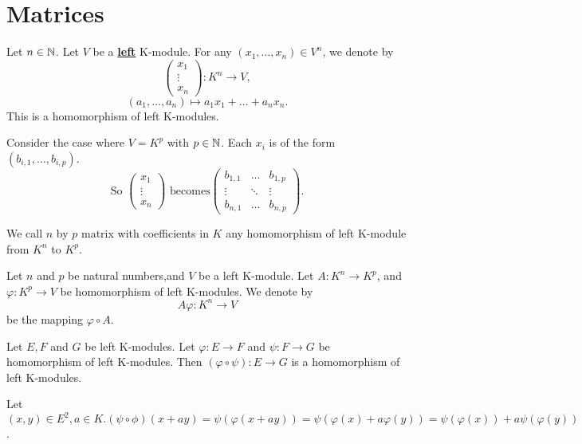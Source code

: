 \section{Matrices}
\begin{definitionenv}
    Let $n\in \mathbb{N}$. Let $V$ be a \underline{\textbf{left}} K-module. For any $(x_1, \dots, x_n)\in V^n$,  we denote by 
    $$\begin{pmatrix}
x_1 \\
 \vdots \\
x_n
\end{pmatrix}
:
K^n\longrightarrow V, $$
$$(a_1, \dots, a_n)\longmapsto a_1x_1+\dots+a_nx_n. $$
This is a homomorphism of left K-modules.
\end{definitionenv}
\begin{exampleenv}
    Consider the case where $V=K^p$ with $p\in \mathbb{N}$. Each $x_i$ is of the form $(b_{i, 1}, \dots, b_{i, p})$.
    $$\text{So } \begin{pmatrix}
x_1 \\
 \vdots \\
x_n
\end{pmatrix}
\text{ becomes}
\begin{pmatrix}
  b_{1, 1}& \dots  &b_{1, p} \\
  \vdots & \ddots  & \vdots \\
  b_{n, 1}& \dots &b_{n, p}
\end{pmatrix} .$$
\end{exampleenv}
\begin{definitionenv}
    We call $n$ by $p$ matrix with coefficients in $K$ any homomorphism of left K-module from $K^n$ to $K^p$.
\end{definitionenv}
\begin{definitionenv}
    Let $n$ and $p$ be natural numbers,and $V$ be a left K-module. Let $A:K^n\rightarrow K^p$, and $\varphi:K^p\rightarrow V$ be homomorphism of left K-modules. We denote by 
    $$A\varphi:K^n\longrightarrow V $$
    be the mapping $\varphi\circ A.$
\end{definitionenv}
\begin{propositionenv}
    Let $E,F$ and $G$ be left K-modules. Let $\varphi:E\rightarrow F$ and $\psi:F\rightarrow G$ be homomorphism of left K-modules. Then $(\varphi\circ \psi):E\rightarrow G$ is a homomorphism of left K-modules.
\end{propositionenv}
\begin{proofenv}
    Let $(x,y)\in E^2, a\in K. (\psi\circ\phi)(x+ay)=\psi(\varphi(x+ay))=\psi(\varphi(x)+a\varphi(y))=\psi(\varphi(x))+a\psi(\varphi(y))$.
\end{proofenv}


